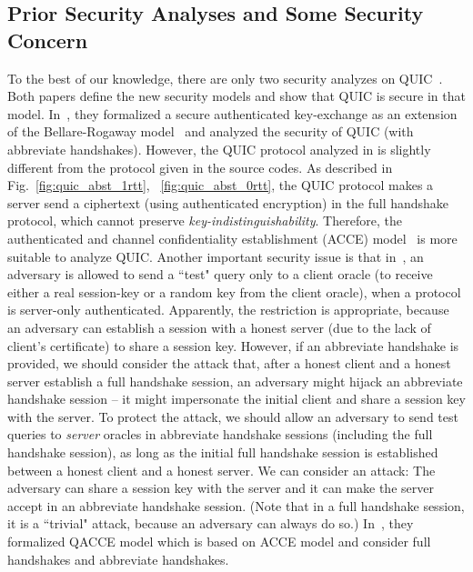 \subsection{Prior Security Analyses and Some Security Concern} \label{sec:concern}
To the best of our knowledge, there are only two
security analyzes on QUIC~\cite{FG14:QUIC,LJBN15:QUIC}.
Both papers define the new security models and show that
QUIC is secure in that model.
In~\cite{FG14:QUIC}, they formalized a secure
authenticated key-exchange as an extension of the
Bellare-Rogaway model~\cite{BR93:AKE} and analyzed the
security of QUIC (with abbreviate handshakes).
However, the QUIC protocol analyzed in \cite{FG14:QUIC}
is slightly different from the protocol given in the
source codes.
As described in Fig.~\ref{fig:quic_abst_1rtt},
~\ref{fig:quic_abst_0rtt}, the QUIC protocol makes a
server send a ciphertext (using authenticated
encryption) in the full handshake protocol, which cannot
preserve \textit{key-indistinguishability}.
Therefore, the authenticated and channel confidentiality
establishment (ACCE) model~\cite{JKSS12:ACCE} is more
suitable to analyze QUIC.
Another important security issue is that in~\cite{FG14:QUIC},
an adversary is allowed to send a ``test" query only to
a client oracle (to receive either a real session-key or
a random key from the client oracle), when a protocol
is server-only authenticated.
Apparently, the restriction is appropriate, because
an adversary can establish a session with a honest
server (due to the lack of client's certificate) to
share a session key.
However, if an abbreviate handshake is provided, we should consider
the attack that, after a honest client and a honest
server establish a full handshake session, an adversary
might hijack an abbreviate handshake session -- it might
impersonate the initial client and share a session key
with the server.
To protect the attack, we should allow an adversary to
send test queries to \textit{server} oracles in abbreviate
handshake sessions (including the full handshake session), as long
as the initial full handshake session is established
between a honest client and a honest server.
We can consider an attack: The adversary can
share a session key with the server and it can make the
server accept in an abbreviate handshake session. (Note that in a
full handshake session, it is a ``trivial" attack, because
an adversary can always do so.)
In~\cite{LJBN15:QUIC}, they formalized QACCE model which
is based on ACCE model and consider full handshakes and
abbreviate handshakes.
